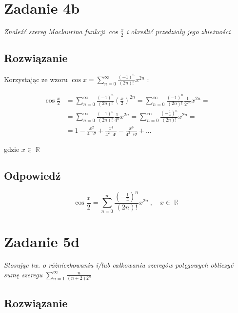 \documentclass{article}
\newcommand{\task}[1]{\textit{#1}}
\DeclareMathOperator{\?}{?}
\DeclareMathOperator{\R}{\mathbb{R}}
\begin{document}
\section*{Zadanie 4b}
\task{Znaleźć szereg Maclaurina funkcji $\displaystyle \cos{\frac{x}{2}}$
i określić przedziały jego zbieżności}

\subsection*{Rozwiązanie}

Korzystając ze wzoru $\displaystyle \cos{x} = \sum_{n=0}^{\infty} \frac{(-1)^n}{(2n)!} x^{2n} $ :

\vspace{1em}

\begin{equation*}
   \begin{aligned}
      \cos{\frac{x}{2}} &=
      \sum_{n=0}^{\infty} \frac{(-1)^n}{(2n)!} \left( \frac{x}{2} \right)^{2n} =
      \sum_{n=0}^{\infty} \frac{(-1)^n}{(2n)!} \frac{1}{2^{2n}} x^{2n} = \\
      &= \sum_{n=0}^{\infty} \frac{(-1)^n}{(2n)!} \frac{1}{4^n} x^{2n} =
      \sum_{n=0}^{\infty} \frac{(-\frac{1}{4})^n}{(2n)!} x^{2n} = \\
      &= 1 - \frac{x^2}{4 \cdot 2!} + \frac{x^4}{4^2 \cdot 4!} - \frac{x^6}{4^3 \cdot 6!} + ...
   \end{aligned}
\end{equation*}

gdzie $x \in \R$

\subsection*{Odpowiedź}
\[ \cos{\frac{x}{2}} = \sum_{n=0}^{\infty} \frac{(-\frac{1}{4})^n}{(2n)!} x^{2n} \ , \quad x \in \R \]

\clearpage

\section*{Zadanie 5d}
\task{Stosując tw. o różniczkowaniu i/lub całkowaniu szeregów potęgowych
obliczyć sumę szeregu $\displaystyle \sum_{n=1}^{\infty} \frac{n}{(n+2)2^n} $}

\subsection*{Rozwiązanie}
\end{document}
